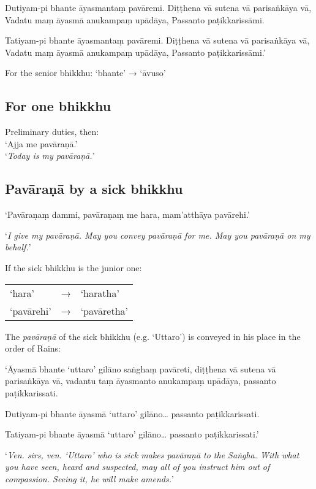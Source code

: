 Dutiyam-pi bhante āyasmantaṃ pavāremi. Diṭṭhena vā sutena vā parisaṅkāya vā,
Vadatu maṃ āyasmā anukampaṃ upādāya, Passanto paṭikkarissāmi.

Tatiyam-pi bhante āyasmantaṃ pavāremi. Diṭṭhena vā sutena vā parisaṅkāya vā,
Vadatu maṃ āyasmā anukampaṃ upādāya, Passanto paṭikkarissāmi.’

For the senior bhikkhu: ‘bhante’ → ‘āvuso’


\subsection{For one bhikkhu}

Preliminary duties, then:\\
‘Ajja me pavāraṇā.’\\
‘\emph{Today is my pavāraṇā.}’ 

\subsection{Pavāraṇā by a sick bhikkhu}

‘Pavāraṇaṃ dammi, pavāraṇaṃ me hara, mam'atthāya pavārehi.’

‘\emph{I give my pavāraṇā. May you convey pavāraṇā for me. May you pavāraṇā on
  my behalf.}’


If the sick bhikkhu is the junior one:

\begin{tabular}{@{}lll@{}}
‘hara’ & → & ‘haratha’\\
‘pavārehi’ & → & ‘pavāretha’\\
\end{tabular}

The \emph{pavāraṇā} of the sick bhikkhu (e.g. ‘Uttaro’) is conveyed in his place
in the order of Rains:

‘Āyasmā bhante ‘uttaro’ gilāno saṅghaṃ pavāreti, diṭṭhena vā sutena vā
parisaṅkāya vā, vadantu taṃ āyasmanto anukampaṃ upādāya, passanto
paṭikkarissati.

Dutiyam-pi bhante āyasmā ‘uttaro’ gilāno… passanto paṭikkarissati.

Tatiyam-pi bhante āyasmā ‘uttaro’ gilāno… passanto paṭikkarissati.’

‘\emph{Ven. sirs, ven. ‘Uttaro’ who is sick makes pavāraṇā to the Saṅgha. With
  what you have seen, heard and suspected, may all of you instruct him out of
  compassion. Seeing it, he will make amends.}’

